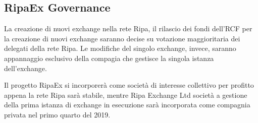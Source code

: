 \documentclass[11pt,fleqn]{book} %
\begin{document}
\subsection{RipaEx Governance}
La creazione di nuovi exchange nella rete Ripa, il rilascio dei fondi dell'RCF per la creazione di nuovi exchange saranno decise
su votazione maggioritaria dei delegati della rete Ripa. Le modifiche del singolo exchange, invece, saranno appannaggio 
esclusivo della compagia che gestisce la singola istanza dell'exchange.

Il progetto RipaEx si incorporerà come società di interesse collettivo per profitto appena la rete Ripa sarà stabile, mentre Ripa Exchange Ltd
società a gestione della prima istanza di exchange in esecuzione sarà incorporata come compagnia privata nel primo quarto
del 2019.
\end{document}
